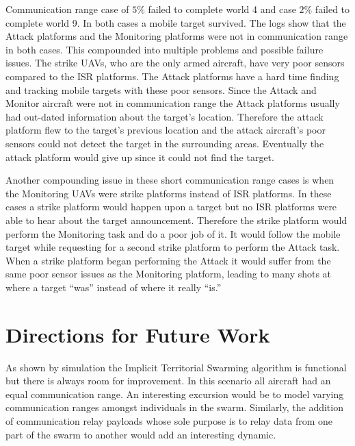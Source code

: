 Communication range case of $5\%$ failed to complete world 4 and case $2\%$ failed to complete world 9.  In both cases a mobile target survived.  The logs show that the Attack platforms and the Monitoring platforms were not in communication range in both cases.  This compounded into multiple problems and possible failure issues.  The strike UAVs, who are the only armed aircraft, have very poor sensors compared to the ISR platforms.  The Attack platforms have a hard time finding and tracking mobile targets with these poor sensors.  Since the Attack and Monitor aircraft were not in communication range the Attack platforms usually had out-dated information about the target's location.  Therefore the attack platform flew to the target's previous location and the attack aircraft's poor sensors could not detect the target in the surrounding areas.  Eventually the attack platform would give up since it could not find the target.

Another compounding issue in these short communication range cases is when the Monitoring UAVs were strike platforms instead of ISR platforms.  In these cases a strike platform would happen upon a target but no ISR platforms were able to hear about the target announcement.  Therefore the strike platform would perform the Monitoring task and do a poor job of it.  It would follow the mobile target while requesting for a second strike platform to perform the Attack task.  When a strike platform began performing the Attack it would suffer from the same poor sensor issues as the Monitoring platform, leading to many shots at where a target ``was'' instead of where it really ``is.''


\section{Directions for Future Work}
As shown by simulation the Implicit Territorial Swarming algorithm is functional but there is always room for improvement.  In this scenario all aircraft had an equal communication range.  An interesting excursion would be to model varying communication ranges amongst individuals in the swarm.  Similarly, the addition of communication relay payloads whose sole purpose is to relay data from one part of the swarm to another would add an interesting dynamic.


